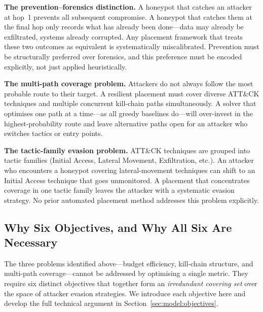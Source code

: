 \documentclass[journal]{IEEEtran}
\begin{document}
\textbf{The prevention--forensics distinction.}
A honeypot that catches an attacker at hop~1 prevents all subsequent
compromise. A honeypot that catches them at the final hop only
records what has already been done---data may already be exfiltrated,
systems already corrupted. Any placement framework that treats these
two outcomes as equivalent is systematically miscalibrated. Prevention
must be structurally preferred over forensics, and this preference must
be encoded explicitly, not just applied heuristically.

\textbf{The multi-path coverage problem.}
Attackers do not always follow the most probable route to their
target. A resilient placement must cover diverse ATT\&CK techniques
and multiple concurrent kill-chain paths simultaneously. A solver
that optimises one path at a time---as all greedy baselines do---will
over-invest in the highest-probability route and leave alternative
paths open for an attacker who switches tactics or entry points.

\textbf{The tactic-family evasion problem.}
ATT\&CK techniques are grouped into tactic families (Initial Access,
Lateral Movement, Exfiltration, etc.). An attacker who encounters a
honeypot covering lateral-movement techniques can shift to an Initial
Access technique that goes unmonitored. A placement that concentrates
coverage in one tactic family leaves the attacker with a systematic
evasion strategy. No prior automated placement method addresses this
problem explicitly.

\subsection{Why Six Objectives, and Why All Six Are Necessary}
\label{sec:intro:whysix}

The three problems identified above---budget efficiency, kill-chain
structure, and multi-path coverage---cannot be addressed by
optimising a single metric. They require six distinct objectives
that together form an \emph{irredundant covering set} over the space
of attacker evasion strategies. We introduce each objective here and
develop the full technical argument in Section~\ref{sec:model:objectives}.
\end{document}
